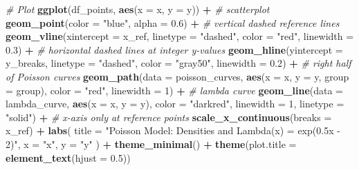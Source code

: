 \documentclass[
]{article}
\newenvironment{Shaded}{\begin{snugshade}}{\end{snugshade}}
\newcommand{\AttributeTok}[1]{\textcolor[rgb]{0.13,0.29,0.53}{#1}}
\newcommand{\CommentTok}[1]{\textcolor[rgb]{0.56,0.35,0.01}{\textit{#1}}}
\newcommand{\DecValTok}[1]{\textcolor[rgb]{0.00,0.00,0.81}{#1}}
\newcommand{\FloatTok}[1]{\textcolor[rgb]{0.00,0.00,0.81}{#1}}
\newcommand{\FunctionTok}[1]{\textcolor[rgb]{0.13,0.29,0.53}{\textbf{#1}}}
\newcommand{\NormalTok}[1]{#1}
\newcommand{\SpecialCharTok}[1]{\textcolor[rgb]{0.81,0.36,0.00}{\textbf{#1}}}
\newcommand{\StringTok}[1]{\textcolor[rgb]{0.31,0.60,0.02}{#1}}
\begin{document}
\begin{Shaded}
\begin{Highlighting}[]
\CommentTok{\# Plot}
\FunctionTok{ggplot}\NormalTok{(df\_points, }\FunctionTok{aes}\NormalTok{(}\AttributeTok{x =}\NormalTok{ x, }\AttributeTok{y =}\NormalTok{ y)) }\SpecialCharTok{+}
  \CommentTok{\# scatterplot}
  \FunctionTok{geom\_point}\NormalTok{(}\AttributeTok{color =} \StringTok{"blue"}\NormalTok{, }\AttributeTok{alpha =} \FloatTok{0.6}\NormalTok{) }\SpecialCharTok{+}
  \CommentTok{\# vertical dashed reference lines}
  \FunctionTok{geom\_vline}\NormalTok{(}\AttributeTok{xintercept =}\NormalTok{ x\_ref, }\AttributeTok{linetype =} \StringTok{"dashed"}\NormalTok{, }
             \AttributeTok{color =} \StringTok{"red"}\NormalTok{, }\AttributeTok{linewidth =} \FloatTok{0.3}\NormalTok{) }\SpecialCharTok{+}
  \CommentTok{\# horizontal dashed lines at integer y{-}values}
  \FunctionTok{geom\_hline}\NormalTok{(}\AttributeTok{yintercept =}\NormalTok{ y\_breaks, }\AttributeTok{linetype =} \StringTok{"dashed"}\NormalTok{, }
             \AttributeTok{color =} \StringTok{"gray50"}\NormalTok{, }\AttributeTok{linewidth =} \FloatTok{0.2}\NormalTok{) }\SpecialCharTok{+}
  \CommentTok{\# right half of Poisson curves}
  \FunctionTok{geom\_path}\NormalTok{(}\AttributeTok{data =}\NormalTok{ poisson\_curves, }\FunctionTok{aes}\NormalTok{(}\AttributeTok{x =}\NormalTok{ x, }\AttributeTok{y =}\NormalTok{ y, }\AttributeTok{group =}\NormalTok{ group),}
            \AttributeTok{color =} \StringTok{"red"}\NormalTok{, }\AttributeTok{linewidth =} \DecValTok{1}\NormalTok{) }\SpecialCharTok{+}
  \CommentTok{\# lambda curve}
  \FunctionTok{geom\_line}\NormalTok{(}\AttributeTok{data =}\NormalTok{ lambda\_curve, }\FunctionTok{aes}\NormalTok{(}\AttributeTok{x =}\NormalTok{ x, }\AttributeTok{y =}\NormalTok{ y),}
            \AttributeTok{color =} \StringTok{"darkred"}\NormalTok{, }\AttributeTok{linewidth =} \DecValTok{1}\NormalTok{, }\AttributeTok{linetype =} \StringTok{"solid"}\NormalTok{) }\SpecialCharTok{+}
  \CommentTok{\# x{-}axis only at reference points}
  \FunctionTok{scale\_x\_continuous}\NormalTok{(}\AttributeTok{breaks =}\NormalTok{ x\_ref) }\SpecialCharTok{+}
  \FunctionTok{labs}\NormalTok{(}
    \AttributeTok{title =} \StringTok{"Poisson Model: Densities and Lambda(x) = exp(0.5x {-} 2)"}\NormalTok{,}
    \AttributeTok{x =} \StringTok{"x"}\NormalTok{,}
    \AttributeTok{y =} \StringTok{"y"}
\NormalTok{  ) }\SpecialCharTok{+}
  \FunctionTok{theme\_minimal}\NormalTok{() }\SpecialCharTok{+}
  \FunctionTok{theme}\NormalTok{(}\AttributeTok{plot.title =} \FunctionTok{element\_text}\NormalTok{(}\AttributeTok{hjust =} \FloatTok{0.5}\NormalTok{))}
\end{Highlighting}
\end{Shaded}
\end{document}
